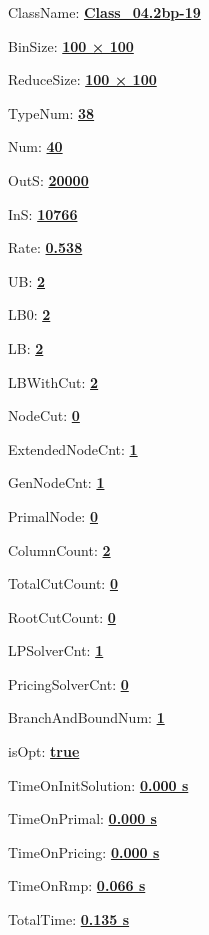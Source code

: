 \documentclass[11pt]{article}
\begin{document}
\pagestyle{empty}


ClassName: \underline{\textbf{Class_04.2bp-19}}
\par
BinSize: \underline{\textbf{100 × 100}}
\par
ReduceSize: \underline{\textbf{100 × 100}}
\par
TypeNum: \underline{\textbf{38}}
\par
Num: \underline{\textbf{40}}
\par
OutS: \underline{\textbf{20000}}
\par
InS: \underline{\textbf{10766}}
\par
Rate: \underline{\textbf{0.538}}
\par
UB: \underline{\textbf{2}}
\par
LB0: \underline{\textbf{2}}
\par
LB: \underline{\textbf{2}}
\par
LBWithCut: \underline{\textbf{2}}
\par
NodeCut: \underline{\textbf{0}}
\par
ExtendedNodeCnt: \underline{\textbf{1}}
\par
GenNodeCnt: \underline{\textbf{1}}
\par
PrimalNode: \underline{\textbf{0}}
\par
ColumnCount: \underline{\textbf{2}}
\par
TotalCutCount: \underline{\textbf{0}}
\par
RootCutCount: \underline{\textbf{0}}
\par
LPSolverCnt: \underline{\textbf{1}}
\par
PricingSolverCnt: \underline{\textbf{0}}
\par
BranchAndBoundNum: \underline{\textbf{1}}
\par
isOpt: \underline{\textbf{true}}
\par
TimeOnInitSolution: \underline{\textbf{0.000 s}}
\par
TimeOnPrimal: \underline{\textbf{0.000 s}}
\par
TimeOnPricing: \underline{\textbf{0.000 s}}
\par
TimeOnRmp: \underline{\textbf{0.066 s}}
\par
TotalTime: \underline{\textbf{0.135 s}}
\par
\newpage
\end{document}
